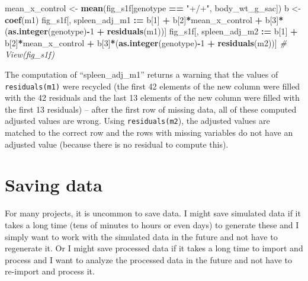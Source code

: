 \documentclass[]{book}
\newenvironment{Shaded}{\begin{snugshade}}{\end{snugshade}}
\newcommand{\CommentTok}[1]{\textcolor[rgb]{0.56,0.35,0.01}{\textit{#1}}}
\newcommand{\DecValTok}[1]{\textcolor[rgb]{0.00,0.00,0.81}{#1}}
\newcommand{\ErrorTok}[1]{\textcolor[rgb]{0.64,0.00,0.00}{\textbf{#1}}}
\newcommand{\KeywordTok}[1]{\textcolor[rgb]{0.13,0.29,0.53}{\textbf{#1}}}
\newcommand{\NormalTok}[1]{#1}
\newcommand{\OperatorTok}[1]{\textcolor[rgb]{0.81,0.36,0.00}{\textbf{#1}}}
\newcommand{\StringTok}[1]{\textcolor[rgb]{0.31,0.60,0.02}{#1}}
\begin{document}
\begin{Shaded}
\begin{Highlighting}[]
\NormalTok{mean_x_control <-}\StringTok{ }\KeywordTok{mean}\NormalTok{(fig_s1f[genotype }\OperatorTok{==}\StringTok{ "+/+"}\NormalTok{, body_wt_g_sac])}
\NormalTok{b <-}\StringTok{ }\KeywordTok{coef}\NormalTok{(m1)}
\NormalTok{fig_s1f[, spleen_adj_m1 }\OperatorTok{:}\ErrorTok{=}\StringTok{ }\NormalTok{b[}\DecValTok{1}\NormalTok{] }\OperatorTok{+}
\StringTok{          }\NormalTok{b[}\DecValTok{2}\NormalTok{]}\OperatorTok{*}\NormalTok{mean_x_control }\OperatorTok{+}
\StringTok{          }\NormalTok{b[}\DecValTok{3}\NormalTok{]}\OperatorTok{*}\NormalTok{(}\KeywordTok{as.integer}\NormalTok{(genotype)}\OperatorTok{-}\DecValTok{1} \OperatorTok{+}
\StringTok{          }\KeywordTok{residuals}\NormalTok{(m1))]}
\NormalTok{fig_s1f[, spleen_adj_m2 }\OperatorTok{:}\ErrorTok{=}\StringTok{ }\NormalTok{b[}\DecValTok{1}\NormalTok{] }\OperatorTok{+}
\StringTok{          }\NormalTok{b[}\DecValTok{2}\NormalTok{]}\OperatorTok{*}\NormalTok{mean_x_control }\OperatorTok{+}
\StringTok{          }\NormalTok{b[}\DecValTok{3}\NormalTok{]}\OperatorTok{*}\NormalTok{(}\KeywordTok{as.integer}\NormalTok{(genotype)}\OperatorTok{-}\DecValTok{1} \OperatorTok{+}
\StringTok{          }\KeywordTok{residuals}\NormalTok{(m2))]}
\CommentTok{# View(fig_s1f)}
\end{Highlighting}
\end{Shaded}

The computation of ``spleen\_adj\_m1'' returns a warning that the values of \texttt{residuals(m1)} were recycled (the first 42 elements of the new column were filled with the 42 residuals and the last 13 elements of the new column were filled with the first 13 residuals) -- after the first row of missing data, all of these computed adjusted values are wrong. Using \texttt{residuals(m2}), the adjusted values are matched to the correct row and the rows with missing variables do not have an adjusted value (because there is no residual to compute this).

\hypertarget{saving-data}{%
\section{Saving data}\label{saving-data}}

For many projects, it is uncommon to save data. I might save simulated data if it takes a long time (tens of minutes to hours or even days) to generate these and I simply want to work with the simulated data in the future and not have to regenerate it. Or I might save processed data if it takes a long time to import and process and I want to analyze the processed data in the future and not have to re-import and process it.
\end{document}
